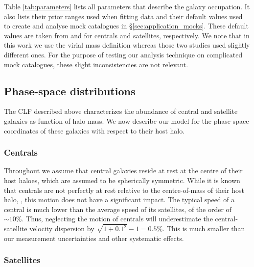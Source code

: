 \documentclass[fleqn,usenatbib,useAMS]{mnras}
\begin{document}
	Table \ref{tab:parameters} lists all parameters that describe the galaxy occupation. It also lists their prior ranges used when fitting data and their default values used to create and analyse mock catalogues in \S\ref{sec:application_mocks}. These default values are taken from \cite{More+11} and \cite{Cacciato+13} for centrals and satellites, respectively. We note that in this work we use the virial mass definition whereas those two studies used slightly different ones. For the purpose of testing our analysis technique on complicated mock catalogues, these slight inconsistencies are not relevant.
	
	\subsection{Phase-space distributions}
	\label{subsec:phase-space_distributions}
	
	The CLF described above characterizes the abundance of central and satellite galaxies as function of halo mass. We now describe our model for the phase-space coordinates of these galaxies with respect to their host halo.
	
	\subsubsection{Centrals}
	\label{sec:phase_cen}
	
	Throughout we assume that central galaxies reside at rest at the centre of their host haloes, which are assumed to be spherically symmetric. While it is known that centrals are not perfectly at rest relative to the centre-of-mass of their host halo, \citep[][]{vdBosch+05a, Behroozi+13, Guo+15a, Guo+15b, Guo+16, Ye+17}, this motion does not have a significant impact. The typical speed of a central is much lower than the average speed of its satellites, of the order of $\sim 10\%$. Thus, neglecting the motion of centrals will underestimate the central-satellite velocity dispersion by $\sqrt{1 + 0.1^2} - 1 = 0.5\%$. This is much smaller than our measurement uncertainties and other systematic effects.
	
	\subsubsection{Satellites}
	\label{sec:phase_sat}
	
\end{document}
